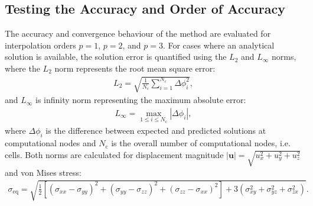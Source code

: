 \documentclass[review,3p]{elsarticle}
\begin{document}
\subsection{Testing the Accuracy and Order of Accuracy}
%
The accuracy and convergence behaviour of the method are evaluated for interpolation orders $p = 1$, $p = 2$, and $p = 3$.
For cases where an analytical solution is available, the solution error is quantified using the $L_2$ and $L_\infty$ norms,
where the $L_2$ norm represents the root mean square error:
\begin{eqnarray}
	L_2 = \sqrt{\frac{1}{N_{\text{c}}}\sum_{i=1}^{N_{\text{c}}} \Delta \phi_i^2},
\end{eqnarray}
and $L_\infty$ is infinity norm representing the maximum absolute error:
\begin{eqnarray}
	L_{\infty} = \max_{1 \leq i \leq N_{\text{c}}} |\Delta \phi_i|,
\end{eqnarray}
where $\Delta \phi_i$ is the difference between expected and predicted solutions at computational nodes and $N_{\text{c}}$ is the overall number of computational nodes, i.e. cells.
Both norms are calculated for displacement magnitude $|\boldsymbol{u}|=\sqrt{u_x^2+u_y^2+u_z^2}$ and von Mises stress:
\begin{eqnarray}
	\sigma_\text{eq}=\sqrt{\frac{1}{2}\left[  (\sigma_{xx}-\sigma_{yy})^2+(\sigma_{yy}-\sigma_{zz})^2+(\sigma_{zz}-\sigma_{xx})^2 \right]+3\left(\sigma_{xy}^2+\sigma_{yz}^2+\sigma_{zx}^2\right)}.
\end{eqnarray}
%
\end{document}
